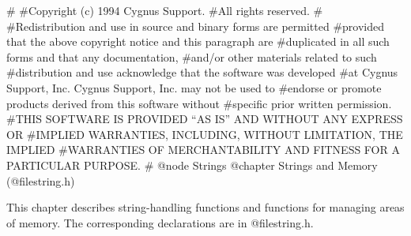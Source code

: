 #
#Copyright (c) 1994 Cygnus Support.
#All rights reserved.
#
#Redistribution and use in source and binary forms are permitted
#provided that the above copyright notice and this paragraph are
#duplicated in all such forms and that any documentation,
#and/or other materials related to such
#distribution and use acknowledge that the software was developed
#at Cygnus Support, Inc.  Cygnus Support, Inc. may not be used to
#endorse or promote products derived from this software without
#specific prior written permission.
#THIS SOFTWARE IS PROVIDED ``AS IS'' AND WITHOUT ANY EXPRESS OR
#IMPLIED WARRANTIES, INCLUDING, WITHOUT LIMITATION, THE IMPLIED
#WARRANTIES OF MERCHANTABILITY AND FITNESS FOR A PARTICULAR PURPOSE.
#
@node Strings
@chapter Strings and Memory (@file{string.h})

This chapter describes string-handling functions and functions for
managing areas of memory.  The corresponding declarations are in
@file{string.h}.

